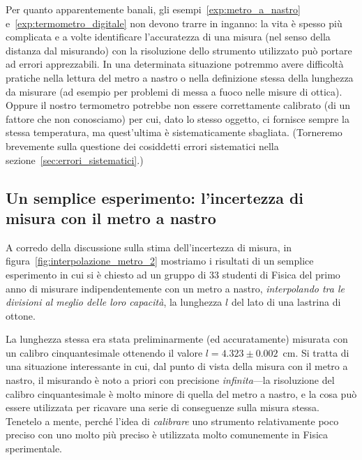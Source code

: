 Per quanto apparentemente banali, gli esempi~\ref{exp:metro_a_nastro}
e~\ref{exp:termometro_digitale} non devono trarre in inganno: la vita è
spesso più complicata e a volte identificare l'accuratezza di una misura
(nel senso della distanza dal misurando) con la risoluzione dello strumento
utilizzato può portare ad errori apprezzabili.
In una determinata situazione potremmo avere difficoltà pratiche nella
lettura del metro a nastro o nella definizione stessa della lunghezza da
misurare (ad esempio per problemi di messa a fuoco nelle misure di ottica).
Oppure il nostro termometro potrebbe non essere correttamente calibrato (di un
fattore che non conosciamo) per cui, dato lo stesso oggetto, ci fornisce sempre
la stessa temperatura, ma quest'ultima è sistematicamente sbagliata.
(Torneremo brevemente sulla questione dei cosiddetti errori sistematici nella
sezione~\ref{sec:errori_sistematici}.)


\subsection{Un semplice esperimento: l'incertezza di misura con il metro a
  nastro}
\label{sec:interpolazione_metro_a_nastro}

A corredo della discussione sulla stima dell'incertezza di misura, in
figura~\ref{fig:interpolazione_metro_2} mostriamo i risultati di un semplice
esperimento in cui si è chiesto ad un gruppo di $33$ studenti di Fisica del
primo anno di misurare indipendentemente con un metro a nastro,
\emph{interpolando tra le divisioni al meglio delle loro capacità},
la lunghezza $l$ del lato di una lastrina di ottone.

La lunghezza stessa era stata preliminarmente (ed accuratamente) misurata con
un calibro cinquantesimale ottenendo il valore $l = 4.323 \pm 0.002$~cm.
Si tratta di una situazione interessante in cui, dal punto di vista della misura
con il metro a nastro, il misurando è noto a priori con precisione
\emph{infinita}---la risoluzione del calibro cinquantesimale è molto minore
di quella del metro a nastro, e la cosa può essere utilizzata per ricavare
una serie di conseguenze sulla misura stessa. Tenetelo a mente, perché l'idea
di \emph{calibrare} uno strumento relativamente poco preciso con uno molto
più preciso è utilizzata molto comunemente in Fisica sperimentale.


